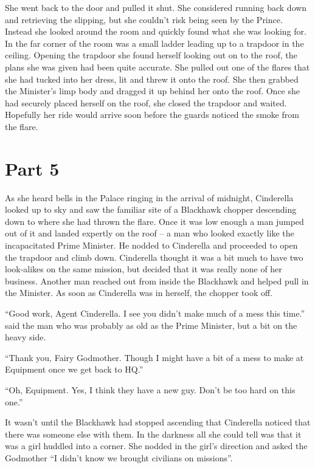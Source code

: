 \documentclass[11pt,letterpaper]{article}
\begin{document}
She went back to the door and pulled it shut. She considered running back down and retrieving the slipping, but she couldn't risk being seen by the Prince. Instead she looked around the room and quickly found what she was looking for. In the far corner of the room was a small ladder leading up to a trapdoor in the ceiling. Opening the trapdoor she found herself looking out on to the roof, the plans she was given had been quite accurate. She pulled out one of the flares that she had tucked into her dress, lit and threw it onto the roof. She then grabbed the Minister's limp body and dragged it up behind her onto the roof. Once she had securely placed herself on the roof, she closed the trapdoor and waited. Hopefully her ride would arrive soon before the guards noticed the smoke from the flare.

\section*{Part 5}

As she heard bells in the Palace ringing in the arrival of midnight, Cinderella looked up to sky and saw the familiar site of a Blackhawk chopper descending down to where she had thrown the flare. Once it was low enough a man jumped out of it and landed expertly on the roof -- a man who looked exactly like the incapacitated Prime Minister. He nodded to Cinderella and proceeded to open the trapdoor and climb down. Cinderella thought it was a bit much to have two look-alikes on the same mission, but decided that it was really none of her business. Another man reached out from inside the Blackhawk and helped pull in the Minister. As soon as Cinderella was in herself, the chopper took off.

``Good work, Agent Cinderella. I see you didn't make much of a mess this time.'' said the man who was probably as old as the Prime Minister, but a bit on the heavy side.

``Thank you, Fairy Godmother. Though I might have a bit of a mess to make at Equipment once we get back to HQ.''

``Oh, Equipment. Yes, I think they have a new guy. Don't be too hard on this one.''

It wasn't until the Blackhawk had stopped ascending that Cinderella noticed that there was someone else with them. In the darkness all she could tell was that it was a girl huddled into a corner. She nodded in the girl's direction and asked the Godmother ``I didn't know we brought civilians on missions''.
\end{document}
